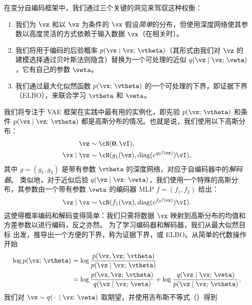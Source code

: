 \documentclass[../../book-main.tex]{subfiles}
\begin{document}
在变分自编码框架中，我们通过三个关键的洞见来驾驭这种权衡：
\begin{enumerate}
\item 我们为 $\vz$ 和以 $\vz$ 为条件的 $\vx$ 假设\textit{简单}的分布，但使用深度网络使其参数以高度灵活的方式依赖于输入数据 $\vx$（在相关时）。
\item 我们将用于编码的后验概率 $p(\vz \mid \vx;\, \vtheta)$（其形式由我们对 $\vz$ 的建模选择通过贝叶斯法则隐含）替换为一个可处理的近似 $q(\vz \mid \vx;\, \veta)$，它有自己的参数 $\veta$。
\item 我们通过最大化似然函数 $p(\vx ;\, \vtheta)$ 的一个可处理的下界，即证据下界（ELBO），来联合学习 $\vtheta$ 和 $\veta$。
\end{enumerate}
我们将专注于 VAE 框架在实践中最有用的实例化，即先验 $p(\vz ;\, \vtheta)$ 和条件 $p(\vx \mid \vz;\,
\vtheta)$ 都是高斯分布的情况。也就是说，我们使用以下高斯分布：
\begin{align*}
\vz &\sim \cN(\Zero, \vI), \\
\vx \mid \vz &\sim \cN(g_1(\vz), \diag(e^{g_2(\vz)}) \vI),
\end{align*}
其中 $g = (g_1, g_2)$ 是带有参数 $\vtheta$ 的深度网络，对应于自编码器中的\textit{解码器}。
类似地，对于近似后验 $q(\vz \mid \vx;\, \veta)$，我们使用一个特殊的高斯分布，其参数由一个带有参数 $\veta$ 的编码器 MLP $f = (f_1, f_2)$ 给出：
\begin{equation*}
\vz \mid \vx \sim \cN(f_1(\vx), \diag(e^{f_2(\vx)}) \vI).
\end{equation*}
这使得概率编码和解码变得简单：我们只需将数据 $\vx$ 映射到高斯分布的均值和方差参数以进行编码，反之亦然。
为了学习编码器和解码器，我们从最大似然目标  出发，推导出一个方便的下界，称为证据下界，或 ELBO。从简单的代数操作开始
\begin{align*}
\log p(\vx;\, \vtheta) &=
\log \frac{p(\vx, \vz;\, \vtheta)}{p(\vz \mid \vx;\, \vtheta)}
\\
&=
\log \frac{p(\vx, \vz;\, \vtheta)}{q(\vz \mid \vx;\, \veta)}
+
\log \frac{q(\vz \mid \vx;\, \veta)}{p(\vz \mid \vx;\, \vtheta)},
\end{align*}
我们对 $\vz \sim q(\,\cdot\, \mid
\vx;\, \veta)$ 取期望，并使用吉布斯不等式（）得到
\end{document}
